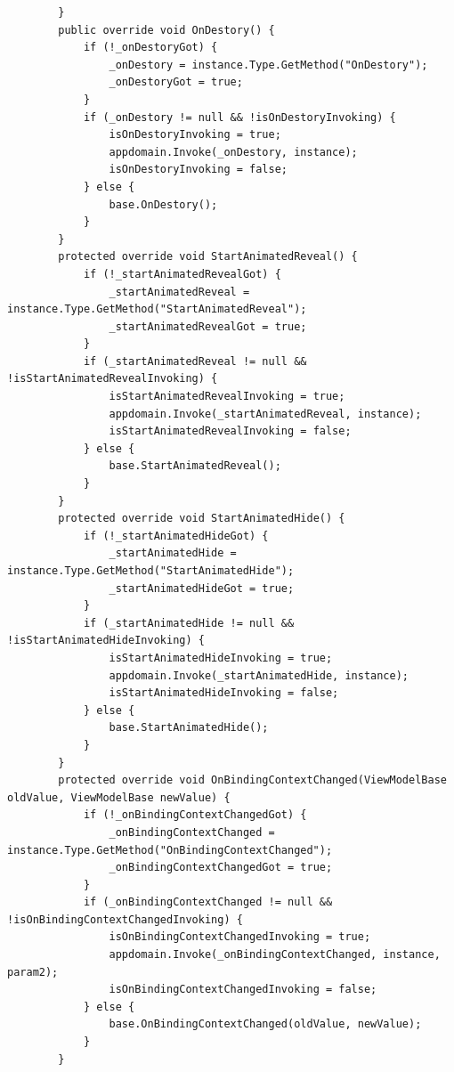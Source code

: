 \documentclass[9pt, b5paper]{article}
\begin{document}
\begin{verbatim}
        }
        public override void OnDestory() {
            if (!_onDestoryGot) {
                _onDestory = instance.Type.GetMethod("OnDestory");
                _onDestoryGot = true;
            }
            if (_onDestory != null && !isOnDestoryInvoking) {
                isOnDestoryInvoking = true;
                appdomain.Invoke(_onDestory, instance);
                isOnDestoryInvoking = false;
            } else {
                base.OnDestory();
            }
        }
        protected override void StartAnimatedReveal() {
            if (!_startAnimatedRevealGot) {
                _startAnimatedReveal = instance.Type.GetMethod("StartAnimatedReveal");
                _startAnimatedRevealGot = true;
            }
            if (_startAnimatedReveal != null && !isStartAnimatedRevealInvoking) {
                isStartAnimatedRevealInvoking = true;
                appdomain.Invoke(_startAnimatedReveal, instance);
                isStartAnimatedRevealInvoking = false;
            } else {
                base.StartAnimatedReveal();
            }
        }
        protected override void StartAnimatedHide() {
            if (!_startAnimatedHideGot) {
                _startAnimatedHide = instance.Type.GetMethod("StartAnimatedHide");
                _startAnimatedHideGot = true;
            }
            if (_startAnimatedHide != null && !isStartAnimatedHideInvoking) {
                isStartAnimatedHideInvoking = true;
                appdomain.Invoke(_startAnimatedHide, instance);
                isStartAnimatedHideInvoking = false;
            } else {
                base.StartAnimatedHide();
            }
        }
        protected override void OnBindingContextChanged(ViewModelBase oldValue, ViewModelBase newValue) {
            if (!_onBindingContextChangedGot) {
                _onBindingContextChanged = instance.Type.GetMethod("OnBindingContextChanged");
                _onBindingContextChangedGot = true;
            }
            if (_onBindingContextChanged != null && !isOnBindingContextChangedInvoking) {
                isOnBindingContextChangedInvoking = true;
                appdomain.Invoke(_onBindingContextChanged, instance, param2);
                isOnBindingContextChangedInvoking = false;
            } else {
                base.OnBindingContextChanged(oldValue, newValue);
            }
        }


\end{verbatim}
\end{document}
